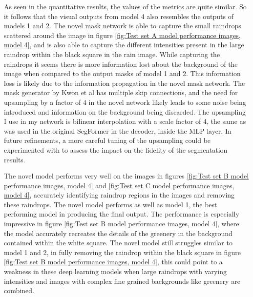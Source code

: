 \documentclass[11pt]{ociamthesis}  %
\begin{document}
As seen in the quantitative results, the values of the metrics are quite similar. So it follows that the visual outputs from model 4 also resembles the outputs of models 1 and 2. The novel mask network is able to capture the small raindrops scattered around the image in figure \ref{fig:Test set A model performance images, model 4}, and is also able to capture the different intensities present in the large raindrop within the black square in the rain image. While capturing the raindrops it seems there is more information lost about the background of the image when compared to the output masks of model 1 and 2. This information loss is likely due to the information propagation in the novel mask network. The mask generator by Kwon et al\cite{Kwon} has multiple skip connections, and the need for upsampling by a factor of 4 in the novel network likely leads to some noise being introduced and information on the background being discarded. The upsampling I use in my network is bilinear interpolation with a scale factor of 4, the same as was used in the original SegFormer in the decoder, inside the MLP layer. In future refinements, a more careful tuning of the upsampling could be experimented with to assess the impact on the fidelity of the segmentation results. 

The novel model performs very well on the images in figures \ref{fig:Test set B model performance images, model 4} and \ref{fig:Test set C model performance images, model 4}, accurately identifying raindrop regions in the images and removing these raindrops. The novel model performs as well as model 1, the best performing model in producing the final output. The performance is especially impressive in figure \ref{fig:Test set B model performance images, model 4}, where the model accurately recreates the details of the greenery in the background contained within the white square. The novel model still struggles similar to model 1 and 2, in fully removing the raindrop within the black square in figure \ref{fig:Test set B model performance images, model 4}, this could point to a weakness in these deep learning models when large raindrops with varying intensities and images with complex fine grained backgrounds like greenery are combined.
\end{document}
